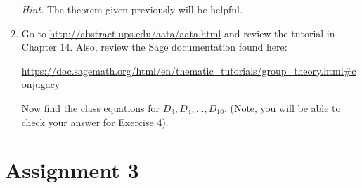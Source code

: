 \begin{enumerate}[label={\sffamily\bfseries\color{main}\arabic*.}]
	{\footnotesize\textit{\color{main}Hint.} The theorem given previously will be helpful.\par}

	\item Go to \url{http://abstract.ups.edu/aata/aata.html} and review the tutorial in Chapter 14. Also, review the Sage documentation found here:

	{\centering\footnotesize\url{https://doc.sagemath.org/html/en/thematic_tutorials/group_theory.html#conjugacy}\par}

	Now find the class equations for $D_3, D_4, \hdots , D_{10}$. (Note, you will be able to check your answer for Exercise 4).
\end{enumerate}

\vfill\pagebreak

\section*{Assignment 3}

